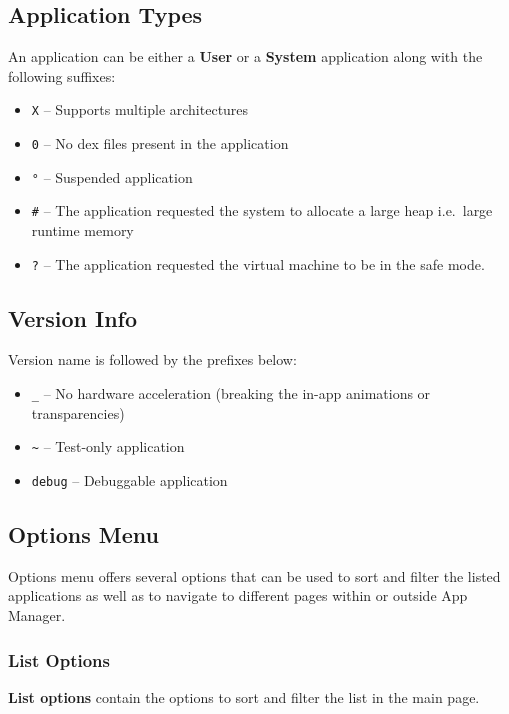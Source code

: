\subsection{Application Types}\label{subsec:main-page-application-types} %
An application can be either a \textbf{User} or a \textbf{System} application along with the following suffixes:
\begin{itemize}
    \item \texttt{X} -- Supports multiple architectures
    \item \texttt{0} -- No dex files present in the application
    \item \texttt{°} -- Suspended application
    \item \texttt{\#} -- The application requested the system to allocate a large heap i.e.\ large runtime memory
    \item \texttt{?} -- The application requested the virtual machine to be in the safe mode.
\end{itemize}

\subsection{Version Info}\label{subsec:main-page-version-info} %
Version name is followed by the prefixes below:
\begin{itemize}
    \item \texttt{\_} -- No hardware acceleration (breaking the in-app animations or transparencies)
    \item \texttt{\textasciitilde} -- Test-only application
    \item \texttt{debug} -- Debuggable application
\end{itemize}

\subsection{Options Menu}\label{subsec:main-page-options-menu} %
Options menu offers several options that can be used to sort and filter the listed applications as well as to navigate
to different pages within or outside App Manager.

\subsubsection{List Options}\label{subsubsec:main-list-options} %
\textbf{List options} contain the options to sort and filter the list in the main page.

